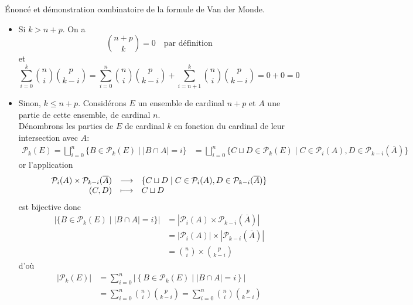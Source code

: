 \documentclass{article}
\begin{document}
\begin{question_kholle}{Énoncé et démonstration combinatoire de la formule de Van der Monde.}
	\begin{itemize}
		\item Si $k>n+p$. On a
		      \[
			      \binom{n+p}{k}=0 \quad\text{par définition}
		      \]
		      et
		      \[
			      \sum_{i=0}^{k}\binom{n}{i}\binom{p}{k-i} = \sum_{i=0}^{n}\binom{n}{i}\binom{p}{k-i} + \sum_{i=n+1}^{k}\binom{n}{i}\binom{p}{k-i} = 0+0 = 0
		      \]
		\item  Sinon, $k\leq n+p$. Considérons $E$ un ensemble de cardinal $n+p$ et $A$ une partie de cette ensemble, de cardinal $n$.\\
		      Dénombrons les parties de $E$ de cardinal $k$ en fonction du cardinal de leur intersection avec $A$:
		      \begin{align*}
			      \mathcal{P}_{k}(E)=\bigsqcup_{i=0}^{n}\{B\in \mathcal{P}_{k}(E) \mid |B\cap A| = i\}
			       & = \bigsqcup_{i=0}^{n}\{C\sqcup D\in \mathcal{P}_{k}(E) \mid C\in \mathcal{P}_{i}(A), D\in \mathcal{P}_{k-i}(\overline{A})\}
		      \end{align*}
		      or l’application
		      \[
			      \begin{array}{rcl} \mathcal{P}_{i}(A)\times \mathcal{P}_{k-i}(\overline{A}) & \longrightarrow & \{C\sqcup D \mid C\in \mathcal{P}_{i}(A), D\in\mathcal{P}_{k-i}(\overline{A})\} \\ (C,D) & \longmapsto & C\sqcup D \end{array}
		      \]
		      est bijective donc
		      \begin{align*}
			      |\{B\in\mathcal{P}_{k}(E) \mid |B\cap A| = i\}| & = |\mathcal{P}_{i}(A) \times \mathcal{P}_{k-i}(\overline{A})|   \\
			                                                      & = |\mathcal{P}_{i}(A)| \times |\mathcal{P}_{k-i}(\overline{A})| \\
			                                                      & = \binom{n}{i} \times \binom{p}{k-i}
		      \end{align*}
		      d’où
		      \begin{align*}
			      |\mathcal{P}_{k}(E)| & = \sum_{i=0}^{n}\left|\left\{B\in \mathcal{P}_{k}(E)\mid |B\cap A|=i\right\}\right|   \\
			                           & = \sum_{i=0}^{n}\binom{n}{i}\binom{p}{k-i} = \sum_{i=0}^{n}\binom{n}{i}\binom{p}{k-i}
		      \end{align*}
	\end{itemize}

\end{question_kholle}
\end{document}
